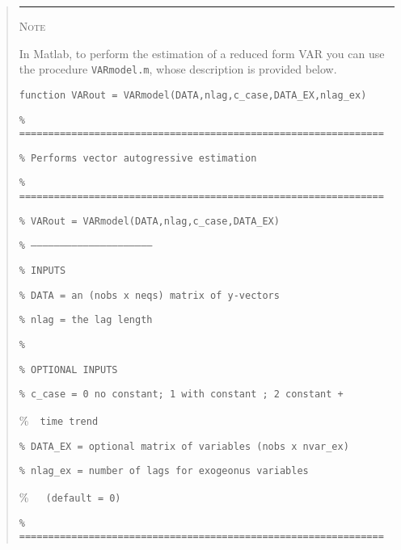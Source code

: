 \documentclass[11pt,a4paper]{report}
\numberwithin{equation}{chapter}
\numberwithin{section}{chapter}
\begin{document}
%
\begin{quotation}
\noindent \rule{1cm}{.4pt}   {\scshape Note}   \hrulefill
\vspace{-.36cm}

\noindent \hrulefill
\small
\singlespacing
\color{note}\sffamily%

In Matlab, to perform the estimation of a reduced form VAR you can use the
procedure \texttt{VARmodel.m}, whose description is provided below.\medskip

\texttt{function VARout = VARmodel(DATA,nlag,c\_case,DATA\_EX,nlag\_ex)}

\texttt{\% ===============================================================}

\texttt{\% Performs vector autogressive estimation}

\texttt{\% ===============================================================}

\texttt{\% VARout = VARmodel(DATA,nlag,c\_case,DATA\_EX)}

\texttt{\% ---------------------------------------------------------------}

\texttt{\% INPUTS }

\texttt{\% DATA = an (nobs x neqs) matrix of y-vectors}

\texttt{\% nlag = the lag length}

\texttt{\%}

\texttt{\% OPTIONAL INPUTS}

\texttt{\% c\_case = 0 no constant; 1 with constant ; 2 constant + }

\%\qquad \qquad \qquad\ \ \texttt{time trend}

\texttt{\% DATA\_EX = optional matrix of variables (nobs x nvar\_ex)}

\texttt{\% nlag\_ex = number of lags for exogeonus variables }

\%\qquad \qquad \qquad\ \ \ \texttt{(default = 0)}

\texttt{\% ===============================================================}%
\medskip

%
\color{black}
\noindent \hrulefill 
\vspace{-.5cm}

\noindent \hrulefill
\end{quotation}
\bigskip%
\end{document}
